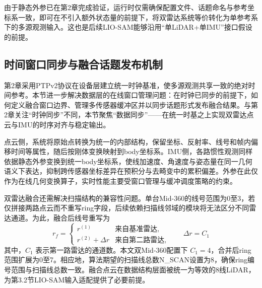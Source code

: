 由于静态外参已在第2章完成验证，运行时仅需确保配置文件、话题命名与参考坐标系一致，即可在不引入额外状态量的前提下，将双雷达系统等价转化为单参考系下的多源观测输入。这也是后续LIO-SAM能够沿用“单LiDAR+单IMU”接口假设的前提。

\subsection{时间窗口同步与融合话题发布机制}\label{ux5916ux53c2ux77e9ux9635ux5e94ux7528ux4e0eux5750ux6807ux7edfux4e00}

第2章采用PTPv2协议在设备层建立统一时钟基准，使多源观测共享一致的绝对时间参考。本节进一步解决数据层的在线窗口管理问题：在时钟已同步的前提下，如何定义融合窗口边界、管理多传感器缓冲区并以同步话题形式发布融合结果。与第2章关注“时钟同步”不同，本节聚焦“数据同步”——在统一时基之上实现双雷达点云与IMU的时序对齐与稳定输出。

点云侧，系统将原始点转换为统一的内部结构，保留坐标、反射率、线号和帧内偏移时间等属性，随后按刚体变换映射到body坐标系。IMU侧，各路惯性观测同样依据静态外参变换到统一body坐标系，使线加速度、角速度与姿态量在同一几何语义下表达，抑制跨传感器坐标差异在预积分与去畸变中的累积偏差。外参在此仅作为在线几何变换算子，实时性能主要受窗口管理与缓冲调度策略的约束。

双雷达融合还需解决扫描结构的兼容性问题。单台Mid-360的线号范围为0至3，若仅拼接两路点云而不重写ring字段，后续依赖扫描线邻域的模块将无法区分不同雷达通道。为此，融合后线号重写为
\begin{equation}
r_f=
\begin{cases}
\displaystyle r^{(1)} & \text{来自基准雷达},\\[6pt]
\displaystyle r^{(2)}+\Delta r & \text{来自第二路雷达},
\end{cases}
\qquad \Delta r=C_1
\end{equation}
其中，$C_1$ 表示第一路雷达的通道数。本文双Mid-360配置下 $C_1=4$，合并后ring范围扩展为0至7。相应地，算法期望的扫描线总数N\_SCAN设置为8，确保ring编号范围与扫描线总数一致。融合点云在数据结构层面被统一为等效的8线LiDAR，为第3.2节LIO-SAM输入适配提供了必要前提。

